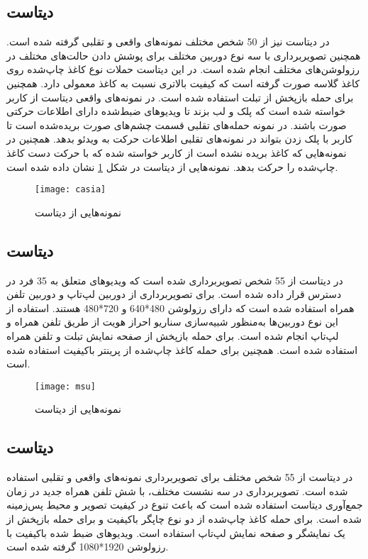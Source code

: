 \subsection{دیتاست }
در دیتاست
  \cite{zhang2012face}
نیز از 50 شخص مختلف نمونه‌های واقعی و تقلبی گرفته شده است. همچنین تصویربرداری با سه نوع دوربین مختلف برای پوشش دادن حالت‌های مختلف در رزولوشن‌های مختلف انجام شده است. در این دیتاست حملات نوع کاغذ چاپ‌شده روی کاغذ گلاسه صورت گرفته است که کیفیت بالاتری نسبت به کاغذ معمولی دارد. همچنین برای حمله بازپخش از تبلت استفاده شده است. در نمونه‌های واقعی دیتاست از کاربر خواسته شده است که پلک و لب بزند تا ویدیوهای ضبط‌شده دارای اطلاعات حرکتی صورت باشند. در نمونه حمله‌های تقلبی قسمت چشم‌های صورت بریده‌شده است تا کاربر با پلک زدن بتواند در نمونه‌های تقلبی اطلاعات حرکت به ویدئو بدهد. همچنین در نمونه‌هایی که کاغذ بریده نشده است از کاربر خواسته شده که با حرکت دست کاغذ چاپ‌شده را حرکت بدهد. نمونه‌هایی از دیتاست  در شکل 
\ref{fig:casia}
نشان داده شده است.

 \begin{figure}[h]
	\centerline{\texttt{[image: casia]}}
	\caption{نمونه‌هایی از دیتاست  \cite{zhang2012face} }
	\label{fig:casia}
\end{figure}

\subsection{دیتاست }
در دیتاست 
\cite{wen2015face}
 از 55 شخص تصویربرداری شده است که ویدیوهای متعلق به 35 فرد در دسترس قرار داده شده است. برای تصویربرداری از دوربین لپ‌تاپ و دوربین تلفن همراه استفاده شده است که دارای رزولوشن 480*640 و 720*480 هستند. استفاده از این نوع دوربین‌ها به‌منظور شبیه‌سازی سناریو احراز هویت از طریق تلفن همراه و لپ‌تاپ انجام شده است. برای حمله باز‌پخش از صفحه نمایش تبلت و تلفن همراه استفاده شده است. همچنین برای حمله کاغذ چاپ‌شده از پرینتر با‌کیفیت استفاده شده است.

 \begin{figure}[h]
	\centerline{\texttt{[image: msu]}}
	\caption{نمونه‌هایی از دیتاست  \cite{wen2015face} }
	\label{fig:msu}
\end{figure}

\subsection{دیتاست }
در دیتاست 
\cite{boulkenafet2017oulu}
از 55 شخص مختلف برای تصویر‌برداری نمونه‌های واقعی و تقلبی استفاده شده است. تصویربرداری در سه نشست مختلف، با شش تلفن همراه جدید در زمان جمع‌آوری دیتاست استفاده شده است که باعث تنوع در کیفیت تصویر و محیط پس‌زمینه شده است. برای حمله کاغذ چاپ‌شده از دو نوع چاپگر با‌کیفیت و برای حمله بازپخش از یک نمایشگر و صفحه نمایش لپ‌تاپ استفاده است. ویدیوهای ضبط شده باکیفیت  با رزولوشن 1920*1080 گرفته شده است.

